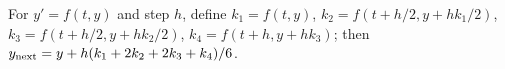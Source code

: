 
For $y'=f(t,y)$ and step $h$, define $k_1=f(t,y)$, $k_2=f(t+h/2,y+hk_1/2)$, $k_3=f(t+h/2,y+hk_2/2)$, $k_4=f(t+h,y+hk_3)$; then $y_{\rm next}=y+h(k_1+2k_2+2k_3+k_4)/6$.
